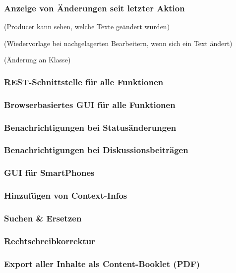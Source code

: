 \subsubsection{Anzeige von Änderungen seit letzter Aktion}

(Producer kann sehen, welche Texte geändert wurden)

(Wiedervorlage bei nachgelagerten Bearbeitern, wenn sich ein Text ändert)

(Änderung an Klasse)

\subsubsection{REST-Schnittstelle für alle Funktionen}

\subsubsection{Browserbasiertes GUI für alle Funktionen}

\subsubsection{Benachrichtigungen bei Statusänderungen}

\subsubsection{Benachrichtigungen bei Diskussionsbeiträgen}

\subsubsection{GUI für SmartPhones}

\subsubsection{Hinzufügen von Context-Infos}

\subsubsection{Suchen \& Ersetzen}

\subsubsection{Rechtschreibkorrektur}

\subsubsection{Export aller Inhalte als Content-Booklet (PDF)}

